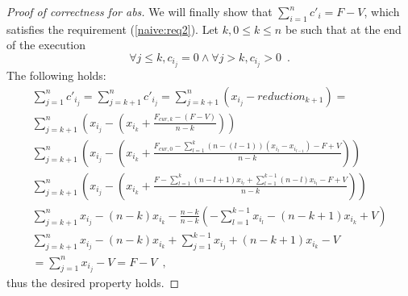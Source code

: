 \begin{proof}[Proof of correctness for abs]
  We will finally show that $\sum\limits_{i=1}^nc'_i = F - V$, which satisfies the requirement (\ref{naive:req2}).
  Let $k, 0 \leq k \leq n$ be such that at the end of the execution
  \begin{equation*}
    \forall j \leq k, c_{i_j} = 0 \wedge \forall j > k, c_{i_j} > 0 \enspace.
  \end{equation*}
  The following holds:
  \begin{equation*}
  \begin{gathered}
    \sum\limits_{j=1}^nc'_{i_j} = \sum\limits_{j=k+1}^nc'_{i_j} = \sum\limits_{j=k+1}^n\left(x_{i_j} -
    reduction_{k+1}\right) = \\
    \sum\limits_{j=k+1}^n\left(x_{i_j} - \left(x_{i_k} + \frac{F_{cur, k} - \left(F - V\right)}{n - k}\right)\right) \\
    \sum\limits_{j=k+1}^n\left(x_{i_j} - \left(x_{i_k} + \frac{F_{cur, 0} - \sum\limits_{l=1}^k\left(n
    - \left(l - 1\right)\right)\left(x_{i_l} - x_{i_{l-1}}\right) - F + V}{n - k}\right)\right) \\
    \sum\limits_{j=k+1}^n\left(x_{i_j} - \left(x_{i_k} + \frac{F - \sum\limits_{l=1}^k\left(n - l + 1\right)x_{i_l} +
    \sum\limits_{l=1}^{k-1}\left(n - l\right)x_{i_l} - F + V}{n - k}\right)\right) \\
    \sum\limits_{j=k+1}^nx_{i_j} - \left(n - k\right)x_{i_k} - \frac{n - k}{n - k}\left(-\sum\limits_{l=1}^{k-1}x_{i_l} -
    \left(n - k + 1\right)x_{i_k} + V\right) \\
    \sum\limits_{j=k+1}^nx_{i_j} - \left(n - k\right)x_{i_k} + \sum\limits_{j=1}^{k-1}x_{i_j} +
    \left(n - k + 1\right)x_{i_k} - V \\
    = \sum\limits_{j=1}^nx_{i_j} - V = F - V \enspace,
  \end{gathered}
  \end{equation*}
  thus the desired property holds.
\end{proof}
